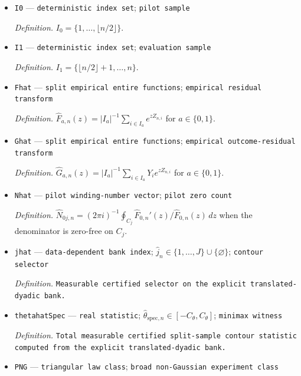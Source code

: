 \documentclass{article}
\begin{document}
\begin{itemize}
  \par\smallskip\noindent\emph{Definition.} \texttt{Fixed stability radius excluding zeros of the nuisance transform on the bank disk.}
  \item \texttt{I0} --- \texttt{deterministic index set}; \texttt{pilot sample}
  \par\smallskip\noindent\emph{Definition.} \(I_0=\{1,\ldots,\lfloor n/2\rfloor\}\).
  \item \texttt{I1} --- \texttt{deterministic index set}; \texttt{evaluation sample}
  \par\smallskip\noindent\emph{Definition.} \(I_1=\{\lfloor n/2\rfloor+1,\ldots,n\}\).
  \item \texttt{Fhat} --- \texttt{split empirical entire functions}; \texttt{empirical residual transform}
  \par\smallskip\noindent\emph{Definition.} \(\widehat F_{a,n}(z)=|I_a|^{-1}\sum_{i\in I_a}e^{zZ_{n,i}}\) for \(a\in\{0,1\}\).
  \item \texttt{Ghat} --- \texttt{split empirical entire functions}; \texttt{empirical outcome-\allowbreak{}residual transform}
  \par\smallskip\noindent\emph{Definition.} \(\widehat G_{a,n}(z)=|I_a|^{-1}\sum_{i\in I_a}Y_i e^{zZ_{n,i}}\) for \(a\in\{0,1\}\).
  \item \texttt{Nhat} --- \texttt{pilot winding-\allowbreak{}number vector}; \texttt{pilot zero count}
  \par\smallskip\noindent\emph{Definition.} \(\widehat N_{0j,n}=(2\pi i)^{-1}\oint_{C_j}\widehat F_{0,n}'(z)/\widehat F_{0,n}(z)\,dz\) when the denominator is zero-free on \(C_j\).
  \item \texttt{jhat} --- \texttt{data-\allowbreak{}dependent bank index}; \(\widehat j_n\in\{1,\ldots,J\}\cup\{\varnothing\}\); \texttt{contour selector}
  \par\smallskip\noindent\emph{Definition.} \texttt{Measurable certified selector on the explicit translated-\allowbreak{}dyadic bank.}
  \item \texttt{thetahatSpec} --- \texttt{real statistic}; \(\widehat\theta_{\mathrm{spec},n}\in[-C_{\theta},C_{\theta}]\); \texttt{minimax witness}
  \par\smallskip\noindent\emph{Definition.} \texttt{Total measurable certified split-\allowbreak{}sample contour statistic computed from the explicit translated-\allowbreak{}dyadic bank.}
  \item \texttt{PNG} --- \texttt{triangular law class}; \texttt{broad non-\allowbreak{}Gaussian experiment class}

\end{itemize}
\end{document}
